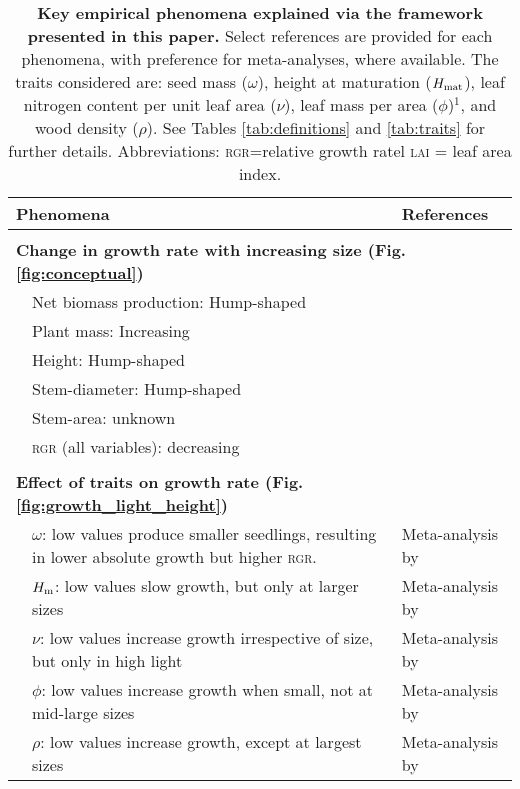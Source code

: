 \documentclass[a4paper,11pt]{article}
\begin{document}
\begin{table}[ht]
\caption{\textbf{Key empirical phenomena explained via the framework presented in this paper.}
Select references are provided for each phenomena, with preference for meta-analyses, where available. The traits considered are: seed mass ($\omega$), height at maturation ($H_{{\rm mat}}$), leaf nitrogen content per unit leaf area ($\nu$), leaf mass per area ($\phi$)$^1$, and wood density ($\rho$). See Tables \ref{tab:definitions} and \ref{tab:traits} for further details. Abbreviations: \textsc{rgr}=relative growth ratel \textsc{lai} = leaf area index.
}
{\footnotesize
{\centering
  \begin{tabular}{p{0.1cm}p{9cm}p{6cm}}
  \\
  \hline
  \multicolumn{2}{l}{ Phenomena} & References \\
  \hline
  \\
  \multicolumn{3}{l}{\bf{Change in growth rate with increasing size} (Fig. \ref{fig:conceptual})}\\
  & Net biomass production: Hump-shaped & \citet{Givnish-1988, Koch-2004} \\
  & Plant mass: Increasing & \citet{Sillett-2010, Stephenson-2014} \\
  & Height: Hump-shaped &  \citet{Ryan-2006, Sillett-2010, King-2011} \\
  & Stem-diameter: Hump-shaped &  \citet{Herault-2011} \\
  & Stem-area: unknown & \\
  & \textsc{rgr} (all variables): decreasing & \citet{Rees-2010, Iida-2014}\\
  \\
  \multicolumn{3}{l}{\bf{Effect of traits on growth rate} (Fig. \ref{fig:growth_light_height})}\\
  & $\omega$: low values produce smaller seedlings, resulting in lower absolute growth but higher \textsc{rgr}. & Meta-analysis by \citet{Gibert-2016} \\
  & $H_{\rm m}$: low values slow growth, but only at larger sizes & Meta-analysis by \citet{Gibert-2016}\\
  & $\nu$: low values increase growth irrespective of size, but only in high light & Meta-analysis by \citet{Gibert-2016}\\
  & $\phi$: low values increase growth when small, not at mid-large sizes & Meta-analysis by \citet{Gibert-2016}\\
  & $\rho$: low values increase growth, except at largest sizes & Meta-analysis by \citet{Gibert-2016}\\


\end{tabular}}}
\end{table}
\end{document}
